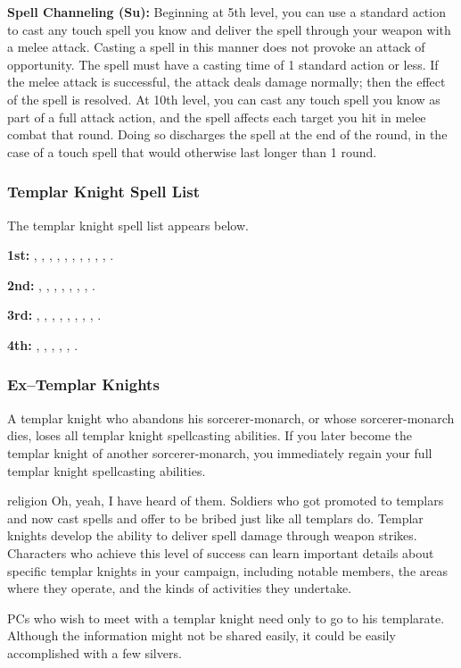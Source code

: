 {\textbf{Spell Channeling (Su):} Beginning at 5th level, you can use a standard action to cast any touch spell you know and deliver the spell through your weapon with a melee attack. Casting a spell in this manner does not provoke an attack of opportunity. The spell must have a casting time of 1 standard action or less. If the melee attack is successful, the attack deals damage normally; then the effect of the spell is resolved. At 10th level, you can cast any touch spell you know as part of a full attack action, and the spell affects each target you hit in melee combat that round. Doing so discharges the spell at the end of the round, in the case of a touch spell that would otherwise last longer than 1 round.

\subsubsection{Templar Knight Spell List}
The templar knight spell list appears below.

\textbf{1st:} , , , , , , , , , , .

\textbf{2nd:} , , , , , , , .

\textbf{3rd:} , , , , , , , , .

\textbf{4th:} , , , , , .

\subsubsection{Ex–Templar Knights}
A templar knight who abandons his sorcerer-monarch, or whose sorcerer-monarch dies, loses all templar knight spellcasting abilities. If you later become the templar knight of another sorcerer-monarch, you immediately regain your full templar knight spellcasting abilities.
}
{}
{religion}
{Oh, yeah, I have heard of them. Soldiers who got promoted to templars and now cast spells and offer to be bribed just like all templars do.}
{Templar knights develop the ability to deliver spell damage through weapon strikes.}
{Characters who achieve this level of success can learn important details about specific templar knights in your campaign, including notable members, the areas where they operate, and the kinds of activities they undertake.}

PCs who wish to meet with a templar knight need
only to go to his templarate. Although the information
might not be shared easily, it could be easily
accomplished with a few silvers.